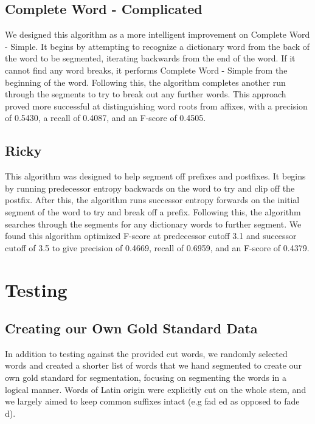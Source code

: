 \documentclass[11pt,letterpaper]{article}
\begin{document}
\subsection{Complete Word - Complicated}
 We designed this algorithm as a more intelligent improvement on Complete Word - Simple. It begins by attempting to recognize a dictionary word from the back of the word to be segmented, iterating backwards from the end of the word. If it cannot find any word breaks, it performs Complete Word - Simple from the beginning of the word. Following this, the algorithm completes another run through the segments to try to break out any further words. This approach proved more successful at distinguishing word roots from affixes, with a precision of 0.5430, a recall of 0.4087, and an F-score of 0.4505.

\subsection{Ricky}
 This algorithm was designed to help segment off prefixes and postfixes. It begins by running predecessor entropy backwards on the word to try and clip off the postfix. After this, the algorithm runs successor entropy forwards on the initial segment of the word to try and break off a prefix. Following this, the algorithm searches through the segments for any dictionary words to further segment. We found this algorithm optimized F-score at predecessor cutoff 3.1 and successor cutoff of 3.5 to give precision of 0.4669, recall of 0.6959, and an F-score of 0.4379. 

\section{Testing}


\subsection{Creating our Own Gold Standard Data}
  In addition to testing against the provided cut words, we randomly selected words and created a shorter list of words that we hand segmented to create our own gold standard for segmentation, focusing on segmenting the words in a logical manner.  Words of Latin origin were explicitly cut on the whole stem, and we largely aimed to keep common suffixes intact (e.g fad ed as opposed to fade d).  
    
\end{document}
